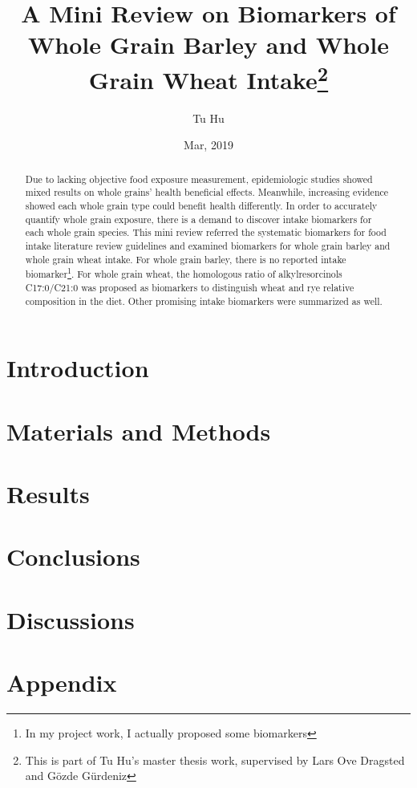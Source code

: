 \documentclass[]{article}
\title{A Mini Review on Biomarkers of Whole Grain Barley and Whole Grain Wheat Intake\footnote{This is part of Tu Hu's master thesis work, supervised by Lars Ove Dragsted and Gözde Gürdeniz}}
\author{Tu Hu}
\date{Mar, 2019}
\begin{document}
\maketitle

\begin{abstract}
Due to lacking objective food exposure measurement, epidemiologic studies showed mixed results on whole grains' health beneficial effects.
Meanwhile, increasing evidence showed each whole grain type could benefit health differently. 
In order to accurately quantify whole grain exposure, there is a demand to discover intake biomarkers for each whole grain species.
This mini review referred the systematic biomarkers for food intake literature review guidelines and examined biomarkers for whole grain barley and whole grain wheat intake.
For whole grain barley, there is no reported intake biomarker\footnote{In my project work, I actually proposed some biomarkers}.
For whole grain wheat, the homologous ratio of alkylresorcinols C17:0/C21:0 was proposed as biomarkers to distinguish wheat and rye relative composition in the diet.
Other promising intake biomarkers were summarized as well.

\end{abstract}

\section{Introduction}


\section{Materials and Methods}


\section{Results}



\section{Conclusions}

\section{Discussions}


\section{Appendix}


\clearpage
\printbibliography[
heading=bibintoc,
title={References}
]
\end{document}
